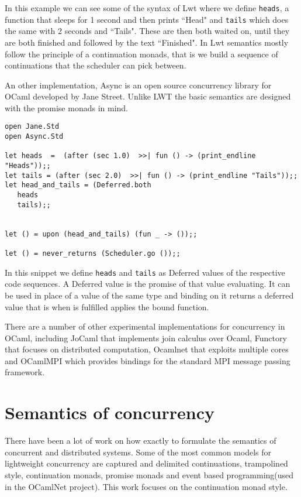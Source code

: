 \documentclass[12pt,twoside,notitlepage]{report}
\begin{document}
In this example we can see some of the syntax of Lwt where we define \verb|heads|, a function that sleeps for 1 second and then prints ``Head" and \verb|tails| which does the same with 2 seconds and ``Tails". These are then both waited on, until they are both finished and followed by the text ``Finished". In Lwt semantics mostly follow the principle of a continuation monads, that is we build a sequence of continuations that the scheduler can pick between.

An other implementation, Async is an open source concurrency library for OCaml developed by Jane Street. Unlike LWT the basic semantics are designed with the promise monads in mind.

\begin{lstlisting}[caption={Async example}]
open Jane.Std
open Async.Std

let heads  =  (after (sec 1.0)  >>| fun () -> (print_endline "Heads"));;
let tails = (after (sec 2.0)  >>| fun () -> (print_endline "Tails"));;
let head_and_tails = (Deferred.both
   heads
   tails);;


let () = upon (head_and_tails) (fun _ -> ());;
  
let () = never_returns (Scheduler.go ());;
\end{lstlisting}

In this snippet we define \verb|heads| and \verb|tails| as Deferred values of the respective code sequences. A Deferred value is the promise of that value evaluating. It can be used in place of a value of the same type and binding on it returns a deferred value that is when is fulfilled applies the bound function. 


There are a number of other experimental implementations for concurrency in OCaml, including JoCaml\cite{jocaml} that implements join calculus over Ocaml, Functory\cite{functory} that focuses on distributed computation, Ocamlnet that exploits multiple cores and OCamlMPI\cite{ocamlmpi} which provides bindings for the standard MPI message passing framework.


\section{Semantics of concurrency}

There have been a lot of work on how exactly to formulate the semantics of concurrent and distributed systems. Some of the most common models for lightweight concurrency\cite{deleuzelight} are captured\cite{friedman1988applications} and delimited\cite{kiselyov2010delimited} continuations\cite{shan2004shift}, trampolined style\cite{ganz1999trampolined}, continuation monads\cite{Claessen99functionalpearls}, promise monads\cite{liskov1988promises} and event based programming(used in the OCamlNet\cite{Ocamlnet} project). This work focuses on the continuation monad style.
\end{document}
